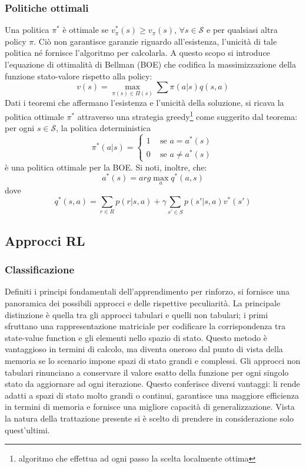 \subsubsection{Politiche ottimali}
Una politica $\pi^*$ è ottimale se $v_\pi^*(s) \geq v_\pi(s)$, $\forall s \in \mathcal{S}$ e per qualsiasi altra policy $\pi$. Ciò non garantisce garanzie riguardo all'esistenza, l'unicità di tale politica né fornisce l'algoritmo per calcolarla. A questo scopo si introduce l'equazione di ottimalità di Bellman (BOE) che codifica la massimizzazione della funzione stato-valore rispetto alla policy:
\begin{equation}v(s)= \max_{\pi(s)\in \Pi(s)}\sum \pi(a|s)q(s,a)\end{equation} 
Dati i teoremi che affermano l'esistenza e l'unicità della soluzione, si ricava la politica ottimale $\pi^*$ attraverso una strategia greedy\footnote{algoritmo che effettua ad ogni passo la scelta localmente ottima} come suggerito dal teorema: per ogni $s \in \mathcal{S}$, la politica deterministica
\begin{equation}\pi^*(a|s)=\begin{cases}
    1\;\;\;\text{ se $a=a^*(s)$}\\
    0\;\;\;\text{ se $a\neq a^*(s)$}
\end{cases}\end{equation}
è una politica ottimale per la BOE. Si noti, inoltre, che:
\begin{equation}a^*(s)=arg \max_a q^*(a,s)\end{equation}
dove
\begin{equation}q^*(s,a)=\sum_{r\in R}p(r|s,a)+\gamma \sum_{s'\in S}p(s'|s,a)v^*(s')\end{equation}


\subsection{Approcci RL}
\subsubsection{Classificazione}
Definiti i principi fondamentali dell'apprendimento per rinforzo, si fornisce una panoramica dei possibili approcci e delle rispettive peculiarità. La principale distinzione è quella tra gli approcci tabulari e quelli non tabulari; i primi sfruttano una rappresentazione matriciale per codificare la corrispondenza tra state-value function e gli elementi nello spazio di stato. Questo metodo è vantaggioso in termini di calcolo, ma diventa oneroso dal punto di vista della memoria se lo scenario impone spazi di stato grandi e complessi. Gli approcci non tabulari rinunciano a conservare il valore esatto della funzione per ogni singolo stato da aggiornare ad ogni iterazione. Questo conferisce diversi vantaggi: li rende adatti a spazi di stato molto grandi o continui, garantisce una maggiore efficienza in termini di memoria e fornisce una migliore capacità di generalizzazione. Vista la natura della trattazione presente si è scelto di prendere in considerazione solo quest'ultimi. 

